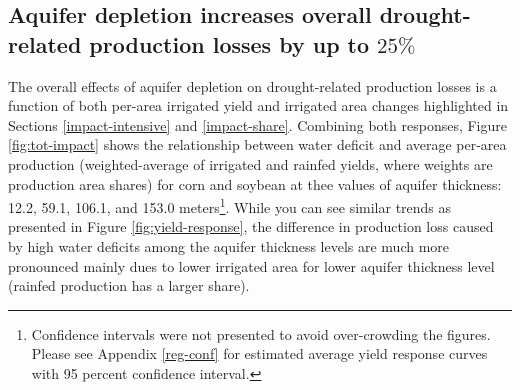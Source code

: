 \documentclass[
]{article}
\begin{document}
\hypertarget{aquifer-depletion-increases-overall-drought-related-production-losses-by-up-to-25}{%
\subsection{\texorpdfstring{Aquifer depletion increases overall drought-related production losses by up to \(25\%\)}{Aquifer depletion increases overall drought-related production losses by up to 25\textbackslash\%}}\label{aquifer-depletion-increases-overall-drought-related-production-losses-by-up-to-25}}

The overall effects of aquifer depletion on drought-related production losses is a function of both per-area irrigated yield and irrigated area changes highlighted in Sections \ref{impact-intensive} and \ref{impact-share}. Combining both responses, Figure \ref{fig:tot-impact} shows the relationship between water deficit and average per-area production (weighted-average of irrigated and rainfed yields, where weights are production area shares) for corn and soybean at thee values of aquifer thickness: 12.2, 59.1, 106.1, and 153.0 meters\footnote{Confidence intervals were not presented to avoid over-crowding the figures. Please see Appendix \ref{reg-conf} for estimated average yield response curves with 95 percent confidence interval.}. While you can see similar trends as presented in Figure \ref{fig:yield-response}, the difference in production loss caused by high water deficits among the aquifer thickness levels are much more pronounced mainly dues to lower irrigated area for lower aquifer thickness level (rainfed production has a larger share).
\end{document}
